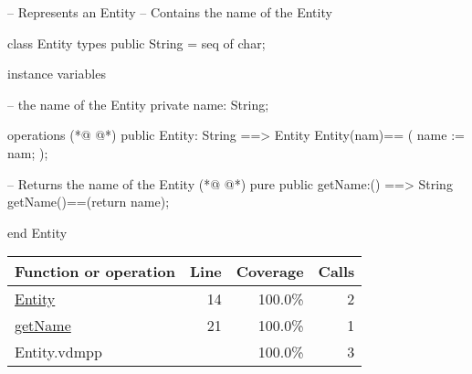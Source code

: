 \begin{vdmpp}[breaklines=true]
-- Represents an Entity
-- Contains the name of the Entity

class Entity 
 types 
  public String = seq of char;
  
 instance variables
 
   -- the name of the Entity
  private name: String;
   
 operations
(*@
\label{Entity:14}
@*)
  public Entity: String ==> Entity
  Entity(nam)==
  (
   name := nam;
  );
  
  -- Returns the name of the Entity
(*@
\label{getName:21}
@*)
  pure public getName:() ==> String
  getName()==(return name);
  
end Entity
\end{vdmpp}
\bigskip
\begin{longtable}{|l|r|r|r|}
\hline
Function or operation & Line & Coverage & Calls \\
\hline
\hline
\hyperref[Entity:14]{Entity} & 14&100.0\% & 2 \\
\hline
\hyperref[getName:21]{getName} & 21&100.0\% & 1 \\
\hline
\hline
Entity.vdmpp & & 100.0\% & 3 \\
\hline
\end{longtable}

